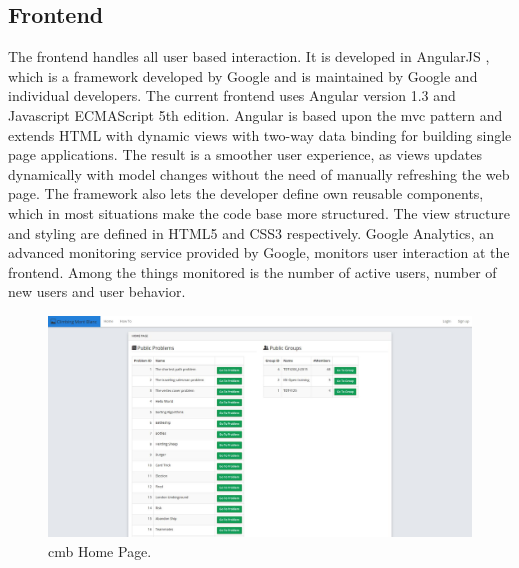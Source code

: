 \subsection{Frontend}
\label{subsec:cmb-arch-frontend}
The frontend handles all user based interaction. It is developed in AngularJS \cite{ANGULARJS}, which is a framework developed by Google and is maintained by Google and individual developers. The current frontend uses Angular version 1.3 and Javascript ECMAScript 5th edition. Angular is based upon the \gls{mvc} pattern \cite{b:mvc} and extends HTML with dynamic views with two-way data binding for building single page applications. The result is a smoother user experience, as views updates dynamically with model changes without the need of manually refreshing the web page. The framework also lets the developer define own reusable components, which in most situations make the code base more structured. The view structure and styling are defined in HTML5 and CSS3 respectively. Google Analytics, an advanced monitoring service provided by Google, monitors user interaction at the frontend. Among the things monitored is the number of active users, number of new users and user behavior. \\

\begin{figure}
    \centering
    \includegraphics[width=1\textwidth]{figs/front_page.jpg}
    \caption{\gls{cmb} Home Page.}
    \label{fig:front-page}
\end{figure}

